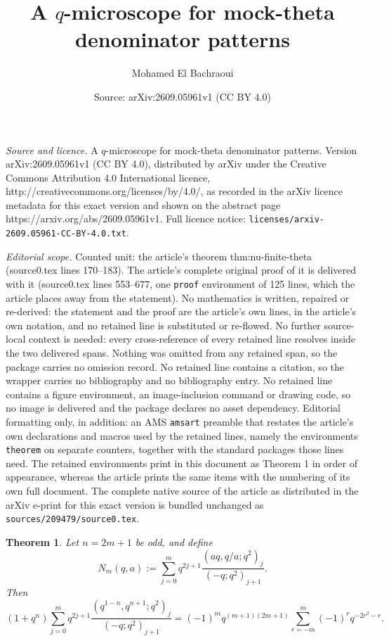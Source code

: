 \documentclass[10pt,a4paper]{amsart}
\title{A $q$-microscope for mock-theta denominator patterns}
\author{Mohamed El Bachraoui}
\date{Source: arXiv:2609.05961v1 (CC BY 4.0)}
\newtheorem{theorem}{Theorem}
\begin{document}
\maketitle

\noindent\emph{Source and licence.} A $q$-microscope for mock-theta denominator patterns. Version arXiv:2609.05961v1 (CC BY 4.0), distributed by arXiv under the Creative Commons Attribution 4.0 International licence, http://creativecommons.org/licenses/by/4.0/, as recorded in the arXiv licence metadata for this exact version and shown on the abstract page https://arxiv.org/abs/2609.05961v1. Full licence notice: \texttt{licenses/arxiv-2609.05961-CC-BY-4.0.txt}.\par\smallskip

\noindent\textit{Editorial scope.} Counted unit: the article's theorem thm:nu-finite-theta (source0.tex lines 170--183). The article's complete original proof of it is delivered with it (source0.tex lines 553--677, one \texttt{proof} environment of 125 lines, which the article places away from the statement). No mathematics is written, repaired or re-derived: the statement and the proof are the article's own lines, in the article's own notation, and no retained line is substituted or re-flowed.  No further source-local context is needed: every cross-reference of every retained line resolves inside the two delivered spans.  Nothing was omitted from any retained span, so the package carries no omission record.  No retained line contains a citation, so the wrapper carries no bibliography and no bibliography entry.  No retained line contains a figure environment, an image-inclusion command or drawing code, so no image is delivered and the package declares no asset dependency.  Editorial formatting only, in addition: an AMS \texttt{amsart} preamble that restates the article's own declarations and macros used by the retained lines, namely the environments \texttt{theorem} on separate counters, together with the standard packages those lines need.  The retained environments print in this document as Theorem 1 in order of appearance, whereas the article prints the same items with the numbering of its own full document.  The complete native source of the article as distributed in the arXiv e-print for this exact version is bundled unchanged as \texttt{sources/209479/source0.tex}.
\begin{theorem}\label{thm:nu-finite-theta}
Let $n=2m+1$ be odd, and define
\[
N_m(q,a):=\sum_{j=0}^{m} q^{2j+1}\frac{(aq,q/a;q^2)_j}{(-q;q^2)_{j+1}}.
\]
Then
\begin{equation}\label{eq:nu-finite-theta}
(1+q^n)\sum_{j=0}^{m} q^{2j+1}
\frac{(q^{1-n},q^{n+1};q^2)_j}{(-q;q^2)_{j+1}}
=
(-1)^m q^{(m+1)(2m+1)}
\sum_{r=-m}^{m} (-1)^r q^{-2r^2-r}.
\end{equation}
\end{theorem}
\end{document}

